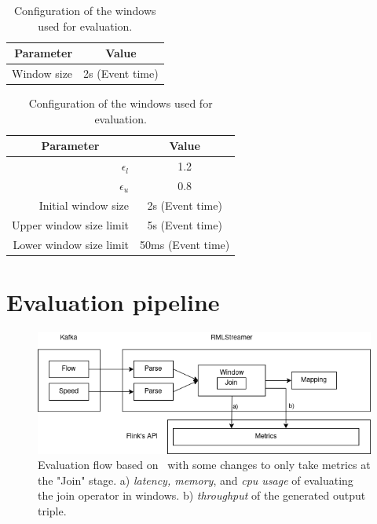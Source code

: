 \begin{table}[htbp]
    \centering
    \begin{subtable}{\textwidth}
        \centering
        \begin{tabular}{|r|c|}
        \hline
        Parameter   & Value           \\ \hline
        Window size & 2s (Event time) \\ \hline
        \end{tabular}
        \caption{Tumbling Window's configuration }
        \label{tab:tumbling_config}
    \end{subtable}


    \begin{subtable}{\textwidth}
        \centering
        \begin{tabular}{|r|c|}
        \hline
        \multicolumn{1}{|c|}{Parameter}               & Value             \\ \hline
        $\epsilon_l$            & 1.2               \\ \hline
        $\epsilon_u$            & 0.8               \\ \hline
        Initial window size     & 2s (Event time)   \\ \hline
        Upper window size limit & 5s (Event time)   \\ \hline
        Lower window size limit & 50ms (Event time) \\ \hline
        \end{tabular}
        \caption{Dynamic Window's configuration}
        \label{tab:dynamic_config}
    \end{subtable}

    \caption{Configuration of the windows used for evaluation.}
    \label{tab:window_configuration}

\end{table}
\newpage

\section{Evaluation pipeline}
\begin{figure}[!htbp]
    \centering
    \includegraphics[width=\textwidth]{fig/evaluation_architecture.png}
    \caption{Evaluation flow based on~\cite{evalution_of_spe} with some changes to only 
    take metrics at the "Join" stage.
    a) \emph{latency, memory}, and \emph{cpu usage} of evaluating the join operator in windows.
    b) \emph{throughput} of the generated output triple.}
    \label{fig:evaluation_flow}
    
\end{figure}

